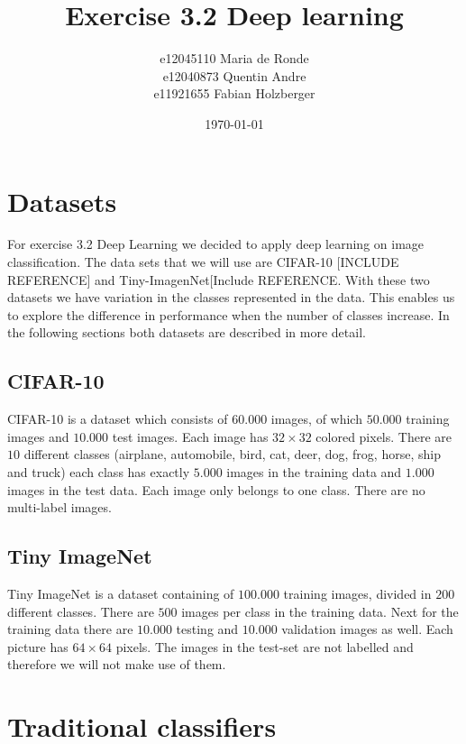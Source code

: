 \documentclass[11pt]{article}
\title{Exercise 3.2 Deep learning}
\author{e12045110 Maria de Ronde \\ e12040873  Quentin Andre  \\ e11921655 Fabian Holzberger}
\date{\today}
\begin{document}
\graphicspath{{./pictures/}}
\maketitle

%
\section{Datasets}
For exercise 3.2 Deep Learning we decided to apply deep learning on image classification. The data sets that we will use are CIFAR-10 [INCLUDE REFERENCE] and Tiny-ImagenNet[Include REFERENCE. With these two datasets we have variation in the classes represented in the data. This  enables us to explore the difference in performance when the number of classes increase. In the following sections both datasets are described in more detail. 

\subsection{CIFAR-10}\label{Sec_Cifar-10}
CIFAR-10 is a dataset which consists of $60.000$ images, of which $50.000$ training images and $10.000$ test images. Each image has $32\times32$ colored pixels.
There are $10$ different classes (airplane, automobile, bird, cat, deer, dog, frog, horse, ship and truck) each class has exactly $5.000$ images in the training data and $1.000$ images in the test data. Each image only belongs to one class. There are no multi-label images. 

\subsection{Tiny ImageNet}\label{Sec_ImageNet}
Tiny ImageNet is a dataset containing of $100.000$ training images, divided in $200$ different classes. There are $500$ images per class in the training data. Next for the training data there are $10.000$ testing and $10.000$ validation images as well. Each picture has $64\times64$ pixels. The images in the test-set are not labelled and therefore we will not make use of them.

\section{Traditional classifiers}
\end{document}
